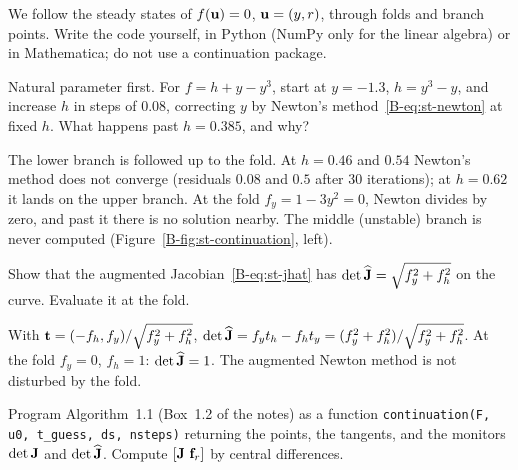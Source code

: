 We follow the steady states of $f(\mathbf{u}) = 0$, $\mathbf{u} = (y,r)$, through folds and
branch points. Write the code yourself, in Python (NumPy only for the linear algebra)
or in Mathematica; do not use a continuation package.

\q Natural parameter first. For $f = h + y - y^3$, start at $y = -1.3$,
$h = y^3 - y$, and increase $h$ in steps of $0.08$, correcting $y$ by Newton's
method~\eqref{B-eq:st-newton} at fixed $h$. What happens past $h = 0.385$, and why?
\begin{answer}
The lower branch is followed up to the fold. At $h = 0.46$ and $0.54$ Newton's method
does not converge (residuals $0.08$ and $0.5$ after 30 iterations); at $h = 0.62$ it
lands on the upper branch. At the fold $f_y = 1 - 3y^2 = 0$, Newton divides by zero,
and past it there is no solution nearby. The middle (unstable) branch is never
computed (Figure~\ref{B-fig:st-continuation}, left).
\end{answer}

\q Show that the augmented Jacobian~\eqref{B-eq:st-jhat} has
$\det\widehat{\mathbf{J}} = \sqrt{f_y^2 + f_h^2}$ on the curve. Evaluate it at the fold.
\begin{answer}
With $\mathbf{t} = (-f_h, f_y)/\sqrt{f_y^2 + f_h^2}$,
$\det\widehat{\mathbf{J}} = f_y t_h - f_h t_y = (f_y^2 + f_h^2)/\sqrt{f_y^2 + f_h^2}$. At the
fold $f_y = 0$, $f_h = 1$: $\det\widehat{\mathbf{J}} = 1$. The augmented Newton method is
not disturbed by the fold.
\end{answer}

\qc Program Algorithm~1.1 (Box~1.2 of the notes) as a function
\texttt{continuation(F, u0, t\_guess, ds, nsteps)} returning the points, the tangents,
and the monitors $\det\mathbf{J}$ and $\det\widehat{\mathbf{J}}$. Compute $[\mathbf{J}\ \mathbf{f}_r]$
by central differences.

